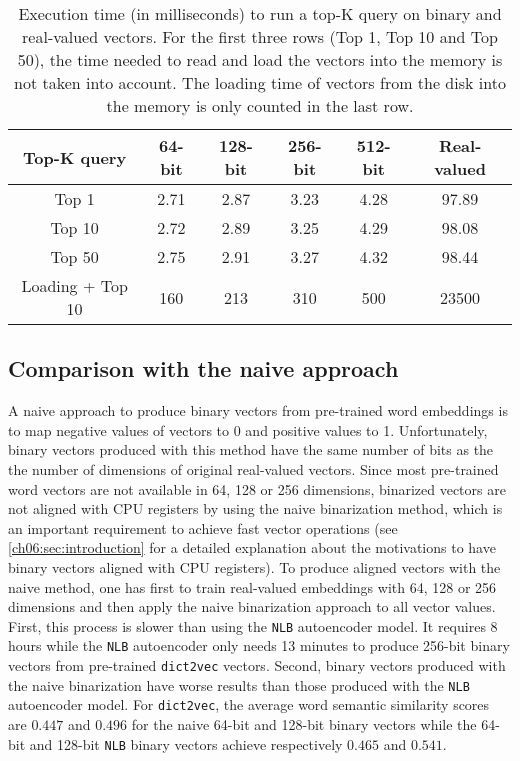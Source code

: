     \begin{table}[h]
      \centering
      \begin{tabular}{cccccc}
        \toprule[0.15em]
        Top-K query      & 64-bit & 128-bit & 256-bit & 512-bit & Real-valued\\
        \midrule
        Top 1            &  2.71  &   2.87  &   3.23  &   4.28  &   97.89    \\
        Top 10           &  2.72  &   2.89  &   3.25  &   4.29  &   98.08    \\
        Top 50           &  2.75  &   2.91  &   3.27  &   4.32  &   98.44    \\
        Loading + Top 10 &  160   &   213   &   310   &   500   &   23500    \\
        \bottomrule[0.15em]
      \end{tabular}
      \caption[Execution time to run a top-K query on binary and real-valued
      vectors.]{Execution time (in milliseconds) to run a top-K query on binary
      and real-valued vectors. For the first three rows (Top 1, Top 10 and Top
      50), the time needed to read and load the vectors into the memory is not
      taken into account. The loading time of vectors from the disk into the
      memory is only counted in the last row.}
      \label{ch06:tab:results-topk}
    \end{table}

  \subsection{Comparison with the naive approach}
    \label{ch06:subsec:performances-naive}
    A naive approach to produce binary vectors from pre-trained word embeddings
    is to map negative values of vectors to 0 and positive values to 1.
    Unfortunately, binary vectors produced with this method have the same number
    of bits as the the number of dimensions of original real-valued vectors.
    Since most pre-trained word vectors are not available in 64, 128 or 256
    dimensions, binarized vectors are not aligned with CPU registers by using
    the naive binarization method, which is an important requirement to achieve
    fast vector operations (see \autoref{ch06:sec:introduction} for a detailed
    explanation about the motivations to have binary vectors aligned with CPU
    registers). To produce aligned vectors with the naive method, one has first
    to train real-valued embeddings with 64, 128 or 256 dimensions and then
    apply the naive binarization approach to all vector values. First, this
    process is slower than using the \texttt{NLB} autoencoder model. It requires
    8 hours while the \texttt{NLB} autoencoder only needs 13 minutes to produce
    256-bit binary vectors from pre-trained \texttt{dict2vec} vectors. Second,
    binary vectors produced with the naive binarization have worse results than
    those produced with the \texttt{NLB} autoencoder model. For
    \texttt{dict2vec}, the average word semantic similarity scores are $0.447$
    and $0.496$ for the naive 64-bit and 128-bit binary vectors while the 64-bit
    and 128-bit \texttt{NLB} binary vectors achieve respectively $0.465$ and
    $0.541$.

